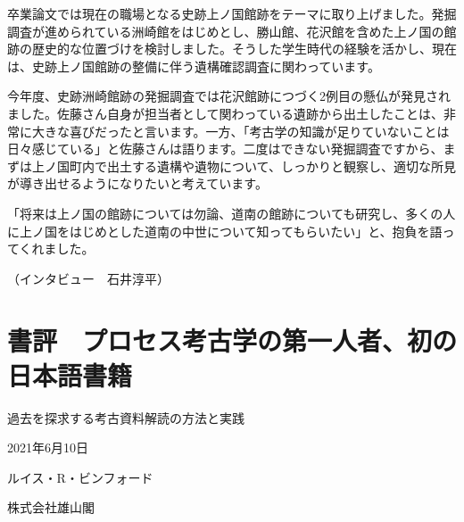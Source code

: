 \documentclass[a4j,11pt,twocolumn,openany]{jsbook}
\begin{document}
卒業論文では現在の職場となる史跡上ノ国館跡をテーマに取り上げました。発掘調査が進められている洲崎館をはじめとし、勝山館、花沢館を含めた上ノ国の館跡の歴史的な位置づけを検討しました。そうした学生時代の経験を活かし、現在は、史跡上ノ国館跡の整備に伴う遺構確認調査に関わっています。

今年度、史跡洲崎館跡の発掘調査では花沢館跡につづく2例目の懸仏が発見されました。佐藤さん自身が担当者として関わっている遺跡から出土したことは、非常に大きな喜びだったと言います。一方、「考古学の知識が足りていないことは日々感じている」と佐藤さんは語ります。二度はできない発掘調査ですから、まずは上ノ国町内で出土する遺構や遺物について、しっかりと観察し、適切な所見が導き出せるようになりたいと考えています。

「将来は上ノ国の館跡については勿論、道南の館跡についても研究し、多くの人に上ノ国をはじめとした道南の中世について知ってもらいたい」と、抱負を語ってくれました。　

\hspace{8zw}（インタビュー　石井淳平）

\chapter{書評　プロセス考古学の第一人者、初の日本語書籍}

\begin{description}	[leftmargin=3.5zw] %
	\item[書　名]過去を探求する考古資料解読の方法と実践
	\item[刊　行]2021年6月10日
	\item[編著者]ルイス・R・ビンフォード
	\item[発　行]株式会社雄山閣
\end{description}
\end{document}
